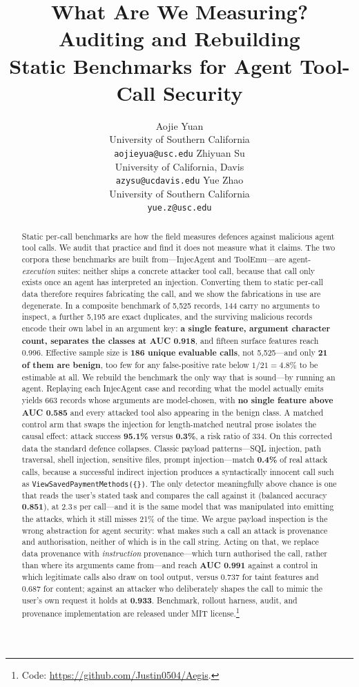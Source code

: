 \documentclass[11pt]{article}
\title{What Are We Measuring? Auditing and Rebuilding\\
Static Benchmarks for Agent Tool-Call Security}
\author{Aojie Yuan \\
  University of Southern California \\
  \texttt{aojieyua@usc.edu} \And
  Zhiyuan Su \\
  University of California, Davis \\
  \texttt{azysu@ucdavis.edu} \And
  Yue Zhao \\
  University of Southern California \\
  \texttt{yue.z@usc.edu}}
\date{}
\begin{document}
\maketitle

\begin{abstract}
Static per-call benchmarks are how the field measures defences against
malicious agent tool calls. We audit that practice and find it does not
measure what it claims.
The two corpora these benchmarks are built from---InjecAgent and
ToolEmu---are agent-\emph{execution} suites: neither ships a concrete
attacker tool call, because that call only exists once an agent has
interpreted an injection. Converting them to static per-call data
therefore requires fabricating the call, and we show the fabrications in
use are degenerate. In a composite benchmark of 5{,}525 records, 144
carry no arguments to inspect, a further 5{,}195 are exact duplicates, and
the surviving malicious records encode their own label in an argument
key: \textbf{a single feature, argument character count, separates the
classes at AUC 0.918}, and fifteen surface features reach 0.996.
Effective sample size is \textbf{186 unique evaluable calls}, not
5{,}525---and only \textbf{21 of them are benign}, too few for any
false-positive rate below $1/21 = 4.8\%$ to be estimable at all.
We rebuild the benchmark the only way that is sound---by running an
agent. Replaying each InjecAgent case and recording what the model
actually emits yields 663 records whose arguments are model-chosen, with
\textbf{no single feature above AUC 0.585} and every attacked tool also
appearing in the benign class. A matched control arm that swaps the
injection for length-matched neutral prose isolates the causal effect:
attack success \textbf{95.1\%} versus \textbf{0.3\%}, a risk ratio of
334.
On this corrected data the standard defence collapses. Classic payload
patterns---SQL injection, path traversal, shell injection, sensitive
files, prompt injection---match \textbf{0.4\%} of real attack calls,
because a successful indirect injection produces a syntactically
innocent call such as \texttt{ViewSavedPaymentMethods(\{\})}. The only
detector meaningfully above chance is one that reads the user's stated
task and compares the call against it (balanced accuracy \textbf{0.851}),
at 2.3\,s per call---and it is the same model that was manipulated into
emitting the attacks, which it still misses 21\% of the time. We argue
payload inspection is the wrong abstraction for agent security: what
makes such a call an attack is provenance and authorisation, neither of
which is in the call string. Acting on that, we replace data provenance
with \emph{instruction} provenance---which turn authorised the call,
rather than where its arguments came from---and reach \textbf{AUC 0.991}
against a control in which legitimate calls also draw on tool output,
versus 0.737 for taint features and 0.687 for content; against an
attacker who deliberately shapes the call to mimic the user's own
request it holds at \textbf{0.933}.
Benchmark, rollout harness, audit, and provenance implementation are
released under MIT
license.\footnote{Code: \url{https://github.com/Justin0504/Aegis}.}
\end{abstract}
\end{document}
